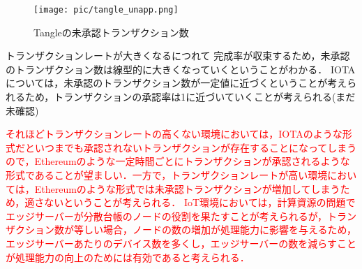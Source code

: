\documentclass[japanese, macos]{KU2}
\begin{document}
\begin{figure}
  \begin{center}
   \texttt{[image: pic/tangle\_unapp.png]}
  \end{center}
  \caption{Tangleの未承認トランザクション数}
  \label{fig:tangle_unapp}
\end{figure}

トランザクションレートが大きくなるにつれて
完成率が収束するため，未承認のトランザクション数は線型的に大きくなっていくということがわかる．
IOTAについては，未承認のトランザクション数が一定値に近づくということが考えられるため，トランザクションの承認率は1に近づいていくことが考えられる(まだ未確認)

\textcolor{red}{それほどトランザクションレートの高くない環境においては，IOTAのような形式だといつまでも承認されないトランザクションが存在することになってしまうので，Ethereumのような一定時間ごとにトランザクションが承認されるような形式であることが望ましい．一方で，トランザクションレートが高い環境においては，Ethereumのような形式では未承認トランザクションが増加してしまうため，適さないということが考えられる．
IoT環境においては，計算資源の問題でエッジサーバーが分散台帳のノードの役割を果たすことが考えられるが，トランザクション数が等しい場合，ノードの数の増加が処理能力に影響を与えるため，エッジサーバーあたりのデバイス数を多くし，エッジサーバーの数を減らすことが処理能力の向上のためには有効であると考えられる．}

\textcolor{red}{}
\end{document}
